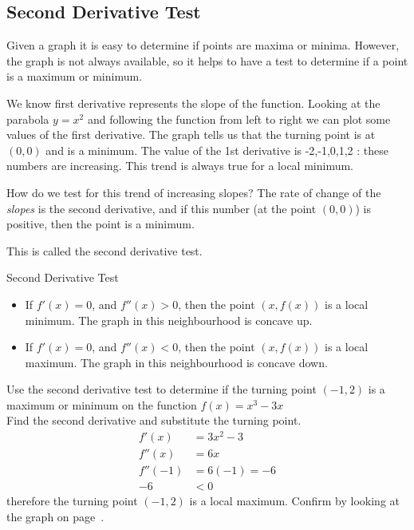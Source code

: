 \subsection*{Second Derivative Test}\label{sec:2ndDerivativeTest}
Given a graph it is easy to determine if points are maxima or minima. However, the graph is not always available, so it  helps to have a test to determine if a point is a maximum or minimum. 

We know first derivative represents the slope of the function. Looking at the parabola $y=x^2$ and following the function from left to right we can plot some values of the first derivative. The graph tells us that the turning point is at $(0,0)$ and is a minimum. The value of the 1st derivative is -2,-1,0,1,2 : these numbers are increasing. This trend is always true for a local minimum. 

How do we test for this trend of increasing slopes? The rate of change of the \emph{slopes} is the second derivative, and if this number (at the point $(0,0)$) is positive, then the point is a minimum.

This is called the second derivative test.\\
\begin{tcolorbox}
	Second Derivative Test
	\begin{itemize}
		\item If $f'(x)=0$, and $f''(x)>0$, then the point $(x,f(x))$ is a local minimum. The graph in this neighbourhood is concave up.\\
		\item If $f'(x)=0$, and $f''(x)<0$, then the point $(x,f(x))$ is a local maximum. The graph in this neighbourhood is concave down.\\                          
	\end{itemize}
\end{tcolorbox}

\clearpage
\example Use the second derivative test to determine if the turning point $(-1,2)$ is a maximum or minimum on the function $f(x)=x^3-3x$\\
\solution Find the second derivative and substitute the turning point.
\begin{align*}
f'(x)&=3x^2-3\\
f''(x)&=6x\\
f''(-1)&=6(-1)=-6\\
-6&<0
\end{align*}therefore the turning point $(-1,2)$ is a local maximum. Confirm by looking at the graph on page~\pageref{fig:maxMin}.

